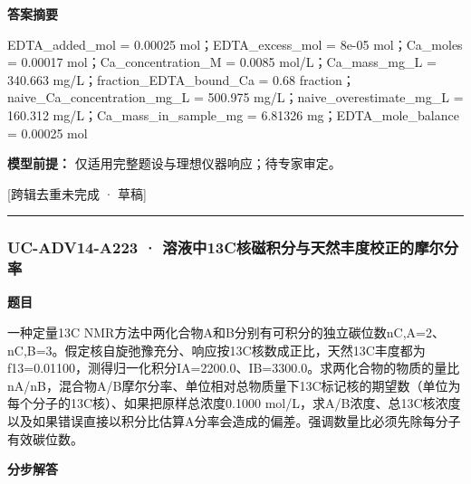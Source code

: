 \documentclass[UTF8,11pt,a4paper]{ctexart}
\begin{document}
\noindent\textbf{答案摘要}\par
EDTA\_added\_mol = 0.00025 mol；EDTA\_excess\_mol = 8e-05 mol；Ca\_moles = 0.00017 mol；Ca\_concentration\_M = 0.0085 mol/L；Ca\_mass\_mg\_L = 340.663 mg/L；fraction\_EDTA\_bound\_Ca = 0.68 fraction；naive\_Ca\_concentration\_mg\_L = 500.975 mg/L；naive\_overestimate\_mg\_L = 160.312 mg/L；Ca\_mass\_in\_sample\_mg = 6.81326 mg；EDTA\_mole\_balance = 0.00025 mol\par
\noindent\textbf{模型前提：}
仅适用完整题设与理想仪器响应；待专家审定。\par
\noindent\textcolor{red!65!black}{[跨辑去重未完成 · 草稿]} \par
\medskip\hrule\medskip
{}
\subsubsection*{UC-ADV14-A223 · 溶液中13C核磁积分与天然丰度校正的摩尔分率}
\noindent\textbf{题目}\par
一种定量13C NMR方法中两化合物A和B分别有可积分的独立碳位数nC,A=2、nC,B=3。假定核自旋弛豫充分、响应按13C核数成正比，天然13C丰度都为f13=0.01100，测得归一化积分IA=2200.0、IB=3300.0。求两化合物的物质的量比nA/nB，混合物A/B摩尔分率、单位相对总物质量下13C标记核的期望数（单位为每个分子的13C核）、如果把原样总浓度0.1000 mol/L，求A/B浓度、总13C核浓度以及如果错误直接以积分比估算A分率会造成的偏差。强调数量比必须先除每分子有效碳位数。\par
\medskip\noindent\textbf{分步解答}
\end{document}
